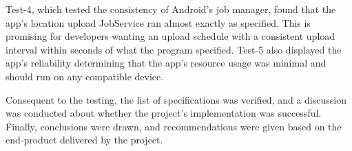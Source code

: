 Test-4, which tested the consistency of Android's job manager, found that the app's location upload JobService ran almost exactly as specified. This is promising for developers wanting an upload schedule with a consistent upload interval within seconds of what the program specified. Test-5 also displayed the app's reliability determining that the app's resource usage was minimal and should run on any compatible device.

Consequent to the testing, the list of specifications was verified, and a discussion was conducted about whether the project's implementation was successful. Finally, conclusions were drawn, and recommendations were given based on the end-product delivered by the project. 
